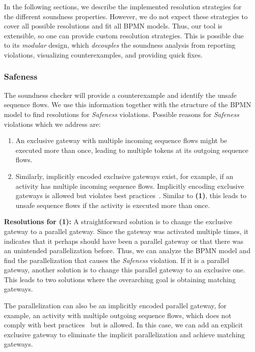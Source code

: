 \documentclass[runningheads]{llncs}
\begin{document}
In the following sections, we describe the implemented resolution strategies for the different soundness properties.
However, we do not expect these strategies to cover all possible resolutions and fit all BPMN models.
Thus, our tool is extensible, so one can provide custom resolution strategies.
This is possible due to its \textit{modular} design, which \textit{decouples} the soundness analysis from reporting violations, visualizing counterexamples, and providing quick fixes.

\subsubsection{Safeness}
The soundness checker will provide a counterexample and identify the unsafe sequence flows.
We use this information together with the structure of the BPMN model to find resolutions for \textit{Safeness} violations.
Possible reasons for \textit{Safeness} violations which we address are:

\begin{enumerate}
	\item An exclusive gateway with multiple incoming sequence flows might be executed more than once, leading to multiple tokens at its outgoing sequence flows.
	\item Similarly, implicitly encoded exclusive gateways exist, for example, if an activity has multiple incoming sequence flows.
	Implicitly encoding exclusive gateways is allowed but violates best practices~\cite{camundaservicesgmbhBpmnlint2024}.
	Similar to \textbf{(1)}, this leads to unsafe sequence flows if the activity is executed more than once.
\end{enumerate}


\textbf{Resolutions for (1):} A straightforward solution is to change the exclusive gateway to a parallel gateway.
Since the gateway was activated multiple times, it indicates that it perhaps should have been a parallel gateway or that there was an unintended parallelization before.
Thus, we can analyze the BPMN model and find the parallelization that causes the \textit{Safeness} violation.
If it is a parallel gateway, another solution is to change this parallel gateway to an exclusive one.
This leads to two solutions where the overarching goal is obtaining matching gateways.

The parallelization can also be an implicitly encoded parallel gateway, for example, an activity with multiple outgoing sequence flows, which does not comply with best practices~\cite{camundaservicesgmbhBpmnlint2024} but is allowed.
In this case, we can add an explicit exclusive gateway to eliminate the implicit parallelization and achieve matching gateways.
\end{document}
